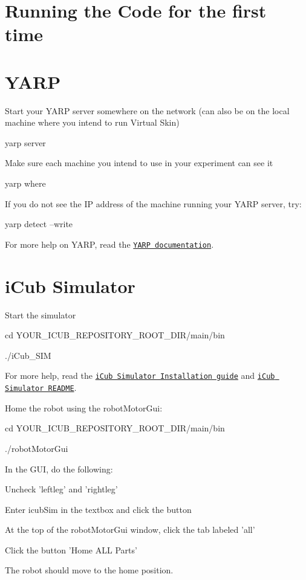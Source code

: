 \hypertarget{run_first_time_title}{}\section{Running the Code for the first time}\label{run_first_time_title}
\hypertarget{run_first_time_yarp}{}\section{YARP}\label{run_first_time_yarp}
Start your YARP server somewhere on the network (can also be on the local machine where you intend to run Virtual Skin) \begin{DoxyVerb}yarp server \end{DoxyVerb}


Make sure each machine you intend to use in your experiment can see it \begin{DoxyVerb}yarp where \end{DoxyVerb}


If you do not see the IP address of the machine running your YARP server, try: \begin{DoxyVerb}yarp detect --write \end{DoxyVerb}
 For more help on YARP, read the \href{http://eris.liralab.it/yarpdoc/index.html}{\tt YARP documentation}.\hypertarget{run_first_time_sim}{}\section{iCub Simulator}\label{run_first_time_sim}
Start the simulator \begin{DoxyVerb}cd YOUR_ICUB_REPOSITORY_ROOT_DIR/main/bin \end{DoxyVerb}
 \begin{DoxyVerb}./iCub_SIM \end{DoxyVerb}
 For more help, read the \href{http://eris.liralab.it/wiki/ODE}{\tt iCub Simulator Installation guide} and \href{http://eris.liralab.it/wiki/Simulator_README}{\tt iCub Simulator README}.

Home the robot using the robotMotorGui: \begin{DoxyVerb}cd YOUR_ICUB_REPOSITORY_ROOT_DIR/main/bin \end{DoxyVerb}
 \begin{DoxyVerb}./robotMotorGui \end{DoxyVerb}
 In the GUI, do the following:
\begin{DoxyItemize}
\item Uncheck 'leftleg' and 'rightleg'
\item Enter {\ttfamily icubSim} in the textbox and click the button
\item At the top of the robotMotorGui window, click the tab labeled 'all'
\item Click the button 'Home ALL Parts'
\end{DoxyItemize}The robot should move to the home position.

